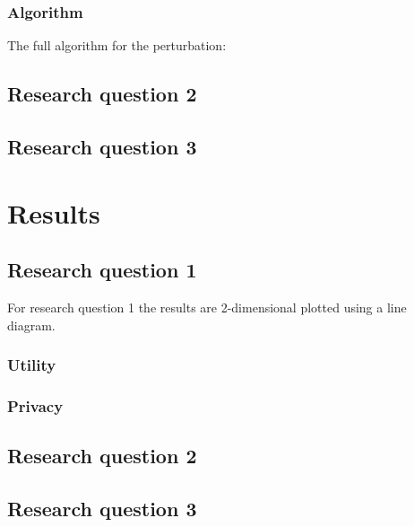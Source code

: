 \newpage
\subsubsection{Algorithm}
The full algorithm for the perturbation:


\subsection{Research question 2}
\subsection{Research question 3}
\section{Results}
\subsection{Research question 1}
For research question 1 the results are 2-dimensional plotted using a line diagram.
\subsubsection{Utility}
\subsubsection{Privacy}

\subsection{Research question 2}
\subsection{Research question 3}